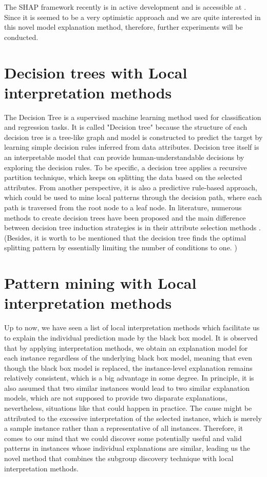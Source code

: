 The SHAP framework recently is in active development and is accessible at \cite{shap}. Since it is seemed to be a very optimistic approach and we are quite interested in this novel model explanation method, therefore, further experiments will be conducted. 

\section{Decision trees with Local interpretation methods}

The Decision Tree is a supervised machine learning method used for classification and regression tasks. It is called "Decision tree" because the structure of each decision tree is a tree-like graph and model is constructed to predict the target by learning simple decision rules inferred from data attributes. Decision tree itself is an interpretable model that can provide human-understandable decisions by exploring the decision rules. To be specific, a decision tree applies a recursive partition technique, which keeps on splitting the data based on the selected attributes. From another perspective, it is also a predictive rule-based approach, which could be used to mine local patterns through the decision path, where each path is traversed from the root node to a leaf node. In literature, numerous methods to create decision trees have been proposed and the main difference between decision tree induction strategies is in their attribute selection methods \cite{quinlan1986induction}. 
(Besides, it is worth to be mentioned that the decision tree finds the optimal splitting pattern by essentially limiting the number of conditions to one. \cite{zimmermann2009cluster})


\section{Pattern mining with Local interpretation methods}


Up to now, we have seen a list of local interpretation methods which facilitate us to explain the individual prediction made by the black box model. It is observed that by applying interpretation methods, we obtain an explanation model for each instance regardless of the underlying black box model, meaning that even though the black box model is replaced, the instance-level explanation remains relatively consistent, which is a big advantage in some degree. In principle, it is also assumed that two similar instances would lead to two similar explanation models, which are not supposed to provide two disparate explanations, nevertheless, situations like that could happen in practice. The cause might be attributed to the excessive interpretation of the selected instance, which is merely a sample instance rather than a representative of all instances. Therefore, it comes to our mind that we could discover some potentially useful and valid patterns in instances whose individual explanations are similar, leading us the novel method that combines the subgroup discovery technique with local interpretation methods. 

